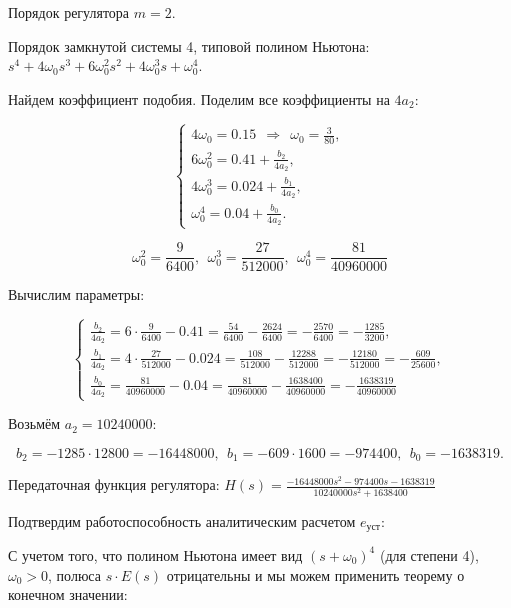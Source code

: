 Порядок регулятора $m=2$.


Порядок замкнутой системы 4, типовой полином Ньютона: $s^4 +4\omega_0 s^3 +6\omega_0^2 s^2 +4\omega_0^3 s+\omega_0^4 .$


Найдем коэффициент подобия. Поделим все коэффициенты на $4a_2$:

\begin{par}
$$\left\lbrace \begin{array}{c}
4\omega_0 =0.15~~\Rightarrow ~~\omega_0 =\frac{3}{80},\\
6\omega_0^2 =0.41+\frac{b_2 }{4a_2 },\\
4\omega_0^3 =0.024+\frac{b_1 }{4a_2 },\\
\omega_0^4 =0.04+\frac{b_0 }{4a_2 }.
\end{array}\right.$$
\end{par}

\begin{par}
$$\omega_0^2 =\frac{9}{6400},~~\omega_0^3 =\frac{27}{512000},~~\omega_0^4 =\frac{81}{40960000}$$
\end{par}


Вычислим параметры:

\begin{par}
$$\left\lbrace \begin{array}{c}
\frac{b_2 }{4a_2 }=6\cdot \frac{9}{6400}-0.41=\frac{54}{6400}-\frac{2624}{6400}=-\frac{2570}{6400}=-\frac{1285}{3200},\\
\frac{b_1 }{4a_2 }=4\cdot \frac{27}{512000}-0.024=\frac{108}{512000}-\frac{12288}{512000}=-\frac{12180}{512000}=-\frac{609}{25600},\\
\frac{b_0 }{4a_2 }=\frac{81}{40960000}-0.04=\frac{81}{40960000}-\frac{1638400}{40960000}=-\frac{1638319}{40960000}
\end{array}\right.$$
\end{par}


Возьмём $a_2 =10240000$:

\begin{par}
$$b_2 =-1285\cdot 12800=-16448000,~~b_1 =-609\cdot 1600=-974400,~~b_0 =-1638319.$$
\end{par}


Передаточная функция регулятора: $H(s)=\frac{-16448000s^2 -974400s-1638319}{10240000s^2 +1638400}$


Подтвердим работоспособность аналитическим расчетом $e_{\text{уст}}$:


С учетом того, что полином Ньютона имеет вид $(s+\omega_0 )^4$ (для степени 4), $\omega_0 >0$, полюса $s\cdot E(s)$ отрицательны и мы можем применить теорему о конечном значении:

